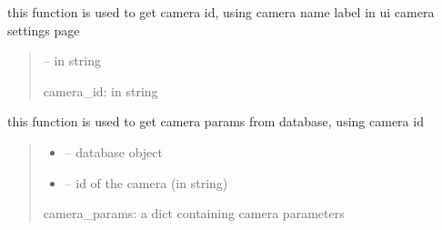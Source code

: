 \documentclass[letterpaper,10pt,english]{sphinxmanual}
\begin{document}

\begin{savenotes}\begin{fulllineitems}
\label{\detokenize{setting/backend/camera_funcs:oxin.backend.camera_funcs.get_camera_id}}
\pysigstartsignatures
{}
\pysigstopsignatures
\sphinxAtStartPar
this function is used to get camera id, using camera name label in ui camera settings page
\begin{quote}\begin{description}
\sphinxAtStartPar
{} – in string

\sphinxAtStartPar
camera\_id: in string

\end{description}\end{quote}

\end{fulllineitems}\end{savenotes}


\begin{savenotes}\begin{fulllineitems}
\label{\detokenize{setting/backend/camera_funcs:oxin.backend.camera_funcs.get_camera_params_from_db}}
\pysigstartsignatures
{}
\pysigstopsignatures
\sphinxAtStartPar
this function is used to get camera params from database, using camera id
\begin{quote}\begin{description}
\begin{itemize}
\item {} 
\sphinxAtStartPar
{} – database object

\item {} 
\sphinxAtStartPar
{} – id of the camera (in string)

\end{itemize}

\sphinxAtStartPar
camera\_params: a dict containing camera parameters

\end{description}\end{quote}

\end{fulllineitems}\end{savenotes}
\end{document}
